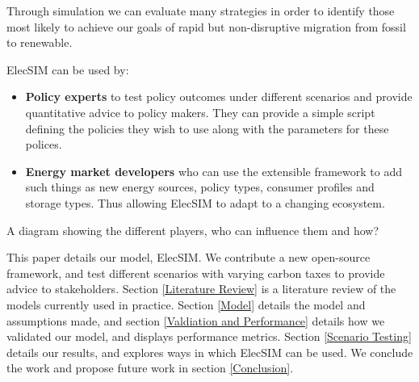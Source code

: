 Through simulation we can evaluate many strategies in order to identify those most likely to achieve our goals of rapid but non-disruptive migration from fossil to renewable.






ElecSIM can be used by:
\begin{itemize}
	\item {\bf Policy experts} to test policy outcomes under different scenarios and provide quantitative advice to policy makers. They can provide a simple script defining the policies they wish to use along with the parameters for these polices.
	\item {\bf Energy market developers} who can use the extensible framework to add such things as new energy sources, policy types, consumer profiles and storage types. Thus allowing ElecSIM to adapt to a changing ecosystem.
\end{itemize}




 {\color{red} A diagram showing the different players, who can influence them and how?}

This paper details our model, ElecSIM. We contribute a new open-source framework, and test different scenarios with varying carbon taxes to provide advice to stakeholders. Section \ref{Literature Review} is a literature review of the models currently used in practice. Section \ref{Model} details the model and assumptions made, and section \ref{Valdiation and Performance} details how we validated our model, and displays performance metrics. Section \ref{Scenario Testing} details our results, and explores ways in which ElecSIM can be used. We conclude the work and propose future work in section \ref{Conclusion}.




%


